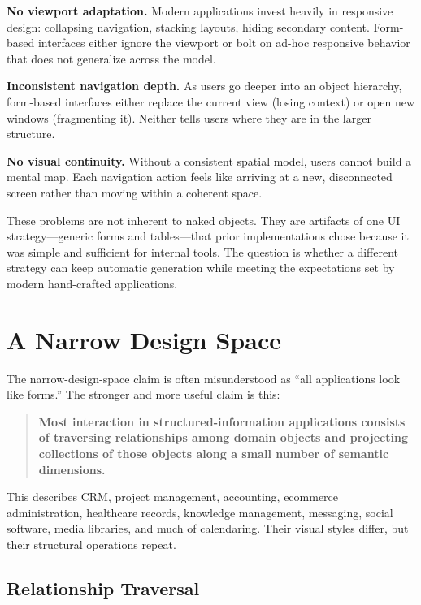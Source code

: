 \documentclass[sigplan,review,anonymous,10pt]{acmart}
\begin{document}
\textbf{No viewport adaptation.} Modern applications invest heavily in responsive design: collapsing navigation, stacking layouts, hiding secondary content. Form-based interfaces either ignore the viewport or bolt on ad-hoc responsive behavior that does not generalize across the model.

\textbf{Inconsistent navigation depth.} As users go deeper into an object hierarchy, form-based interfaces either replace the current view (losing context) or open new windows (fragmenting it). Neither tells users where they are in the larger structure.

\textbf{No visual continuity.} Without a consistent spatial model, users cannot build a mental map. Each navigation action feels like arriving at a new, disconnected screen rather than moving within a coherent space.

These problems are not inherent to naked objects. They are artifacts of one UI strategy---generic forms and tables---that prior implementations chose because it was simple and sufficient for internal tools. The question is whether a different strategy can keep automatic generation while meeting the expectations set by modern hand-crafted applications.

\section{A Narrow Design Space}
\label{sec:narrow}

The narrow-design-space claim is often misunderstood as ``all applications look like forms.'' The stronger and more useful claim is this:

\begin{quote}
\textbf{Most interaction in structured-information applications consists of traversing relationships among domain objects and projecting collections of those objects along a small number of semantic dimensions.}
\end{quote}

This describes CRM, project management, accounting, ecommerce administration, healthcare records, knowledge management, messaging, social software, media libraries, and much of calendaring. Their visual styles differ, but their structural operations repeat.

\subsection{Relationship Traversal}
\label{sec:traversal}
\end{document}
